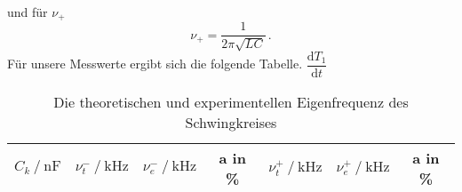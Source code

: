 und für $\nu_+$ 
\begin{equation*}
    \nu_+     =\dfrac{1}{2\pi \sqrt{LC}}\,.
\end{equation*}
Für unsere Messwerte ergibt sich die folgende Tabelle.
{$\dfrac{\text{d}T_1}{\text{d}t}$}
\begin{table}[H]
    \centering
    \begin{tabular}{S S S S S S S}
      \toprule
    {$C_k \mathbin{/} \unit{\nano\farad}$} & {$\nu^-_t \mathbin{/} \unit{\kilo\hertz}$} & {$\nu^-_e \mathbin{/} \unit{\kilo\hertz}$} & {a in \%} & {$\nu^+_t \mathbin{/} \unit{\kilo\hertz}$} & {$\nu^+_e \mathbin{/} \unit{\kilo\hertz}$} & {a in \%}\\
      \midrule
      


      \bottomrule
    \end{tabular}
    \caption{Die theoretischen und experimentellen Eigenfrequenz des Schwingkreises}
  \end{table}